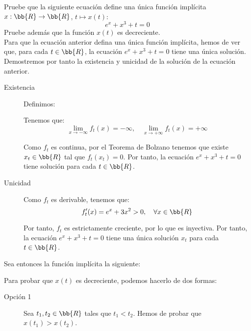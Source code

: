 \documentclass[12pt]{article}
\begin{document}
    \begin{ejercicio}
        Pruebe que la siguiente ecuación define una única función implícita $x: \bb{R} \to \bb{R}$, $t \mapsto x(t)$:
        \begin{equation*}
            e^x + x^3 + t = 0
        \end{equation*}
        Pruebe además que la función $x(t)$ es decreciente.\\

        Para que la ecuación anterior defina una única función implícita, hemos de ver que, para cada $t\in\bb{R}$, la ecuación $e^x + x^3 + t = 0$ tiene una única solución.
        Demostremos por tanto la existencia y unicidad de la solución de la ecuación anterior.
        \begin{description}
            \item[Existencia] 
            Definimos:

            Tenemos que:
            \begin{equation*}
                \lim_{x\to-\infty} f_t(x) = -\infty, \quad \lim_{x\to+\infty} f_t(x) = +\infty
            \end{equation*}

            Como $f_t$ es continua, por el Teorema de Bolzano tenemos que existe $x_t\in\bb{R}$ tal que $f_t(x_t) = 0$. Por tanto, la ecuación $e^x + x^3 + t = 0$ tiene solución para cada $t\in\bb{R}$.

            \item[Unicidad]
            
            Como $f_t$ es derivable, tenemos que:
            \begin{equation*}
                f_t'(x) = e^x + 3x^2 > 0, \quad \forall x\in\bb{R}
            \end{equation*}

            Por tanto, $f_t$ es estrictamente creciente, por lo que es inyectiva. Por tanto, la ecuación $e^x + x^3 + t = 0$ tiene una única solución $x_t$ para cada $t\in\bb{R}$.
        \end{description}
            
        Sea entonces la función implícita la siguiente:

        Para probar que $x(t)$ es decreciente, podemos hacerlo de dos formas:
        \begin{description}
            \item[Opción 1] Sea $t_1, t_2\in\bb{R}$ tales que $t_1 < t_2$. Hemos de probar que $x(t_1) > x(t_2)$.
            

\end{description}
\end{ejercicio}
\end{document}
